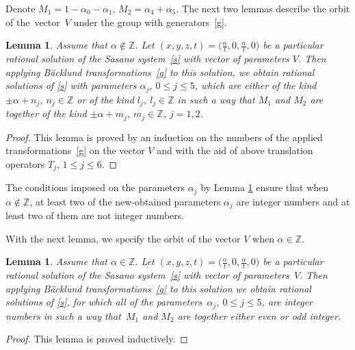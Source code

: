 \documentclass[pdftex]{sigma}
\numberwithin{equation}{section}
\newtheorem{Lemma}[Theorem]{Lemma}
\begin{document}
 Denote
 $M_1=1-\alpha_0-\alpha_1$, $M_2=\alpha_4+\alpha_5$.
 The next two lemmas describe the orbit of the~vector~$V$
 under the group  with generators~\eqref{g}.


 \begin{Lemma}\label{orbit}
 Assume that $\alpha\notin\mathbb{Z}$.
 Let $(x, y, z, t)=\bigl(\frac{\alpha}{t}, 0, \frac{\alpha}{t}, 0\bigr)$ be a particular rational solution
 of the Sasano system~\eqref{s} with vector of parameters $V$.
 Then applying B\"{a}cklund transformations~\eqref{g} to this solution, we obtain rational solutions of
 \eqref{s} with parameters $\alpha_j$, $0 \leq j \leq 5$, which are either of the kind
 $\pm \alpha + n_j$, $n_j\in\mathbb{Z}$ or of the kind $l_j$, $l_j\in\mathbb{Z}$ in such a way that
 $M_1$ and $M_2$ are together of the kind
 $\pm \alpha + m_j$, $m_j\in\mathbb{Z}$, $j=1,2$.
 \end{Lemma}

 \begin{proof}
 This lemma is proved by an induction on the numbers of the applied transformations~\eqref{g}
 on the vector $V$ and with the aid of above translation operators
 $T_j$, $1 \leq j \leq 6$.
\end{proof}

 \begin{Remark}%
 	The conditions imposed on the parameters $\alpha_j$ by Lemma \ref{orbit} ensure that when ${\alpha\notin\mathbb{Z}}$,
 	at least two of the new-obtained parameters $\alpha_j$ are integer numbers and at least two of them are not integer numbers.
 \end{Remark}

 With the next lemma, we specify the orbit
 of the vector $V$ when $\alpha\in\mathbb{Z}$.

 \begin{Lemma}%
 Assume that $\alpha\in\mathbb{Z}$.
 Let $(x, y, z, t)=\bigl(\frac{\alpha}{t}, 0, \frac{\alpha}{t}, 0\bigr)$ be a particular rational solution
 of the Sasano system~\eqref{s} with vector of parameters~$V$.
 Then applying B\"{a}cklund transformations~\eqref{g} to this solution we obtain rational solutions of
 \eqref{s}, for which all of the parameters~$\alpha_j$, $0 \leq j \leq 5$, are integer numbers
 in such a way that~$M_1$ and $M_2$ are together either even or odd integer.
 \end{Lemma}

 \begin{proof}
 This lemma is proved inductively.
 \end{proof}
\end{document}
